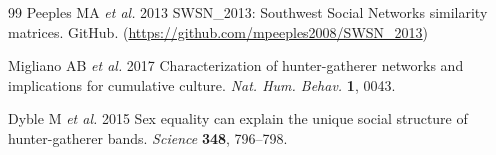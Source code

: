\documentclass[11pt]{article}
\begin{document}
\begin{thebibliography}{99}
Peeples MA \textit{et al.} 2013 SWSN\_2013: Southwest Social Networks similarity matrices. GitHub.
(\url{https://github.com/mpeeples2008/SWSN_2013})

Migliano AB \textit{et al.} 2017 Characterization of hunter-gatherer networks and implications for
cumulative culture. \textit{Nat. Hum. Behav.} \textbf{1}, 0043.

Dyble M \textit{et al.} 2015 Sex equality can explain the unique social structure of hunter-gatherer
bands. \textit{Science} \textbf{348}, 796--798.

\end{thebibliography}
\end{document}
